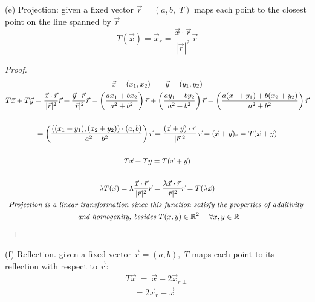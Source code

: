 \documentclass[10pt]{extarticle}
\newcommand{\reall}{\mathbb{R}}
\begin{document}
\begin{itemize}
		(e) Projection: given a fixed vector $\vec{r}=(a,b,\;T)$ maps each point to the closest point on the line spanned by $\vec{r}$
		\[T(\vec{x})=\vec{x}_r=\frac{\vec{x}\cdot\vec{r}}{|\vec{r}|^2}\vec{r}\]
			\begin{proof}
				\begin{gather*}
					\vec{x}=(x_1,x_2)\qquad \vec{y}=(y_1,y_2)
					\\
					T\vec{x}+T\vec{y}=\frac{\vec{x}\cdot\vec{r}}{|\vec{r}|^2}\vec{r}+\frac{\vec{y}\cdot\vec{r}}{|\vec{r}|^2}\vec{r}=\left(\frac{ax_1+bx_2}{a^2+b^2}\right)\vec{r}+\left(\frac{ay_1+by_2}{a^2+b^2}\right)\vec{r}				
					=\left(\frac{a(x_1+y_1)+b(x_2+y_2)}{a^2+b^2}\right)\vec{r}
					\\
					\\
					=\left(\frac{((x_1+y_1),(x_2+y_2))\cdot(a,b)}{a^2+b^2}\right)\vec{r}=\frac{(\vec{x}+\vec{y})\cdot\vec{r}}{|\vec{r}|^2}\:\vec{r}=(\vec{x}+\vec{y})_r=T(\vec{x}+\vec{y})
					\\
					\\
					T\vec{x}+T\vec{y}=T(\vec{x}+\vec{y})
					\\
					\\
					\lambda T(\vec{x})=\lambda\frac{\vec{x}\cdot\vec{r}}{|\vec{r}|^2}\vec{r}=\frac{\lambda\vec{x}\cdot\vec{r}}{|\vec{r}|^2}\vec{r}=T(\lambda\vec{x})
					\\
					\textit{Projection is a linear transformation since this function satisfy the properties of additivity
					}
					\\
					\textit{ and homogenity, besides  $ T(x,y) \in \reall^2 \; \quad \forall x,y\in \reall $}
				\end{gather*}
			\end{proof}
		
		
		
		(f) Reflection. given a fixed vector $\vec{r}=(a,b), \; T$ maps each point to its reflection with respect to $\vec{r}$:
		\begin{gather*}
			T\vec{x}\:=\:\vec{x}-2\vec{x}_{r\perp}
			\\
			\quad  =2\vec{x}_r-\vec{x}
		\end{gather*}
	
	
			

\end{itemize}
\end{document}
